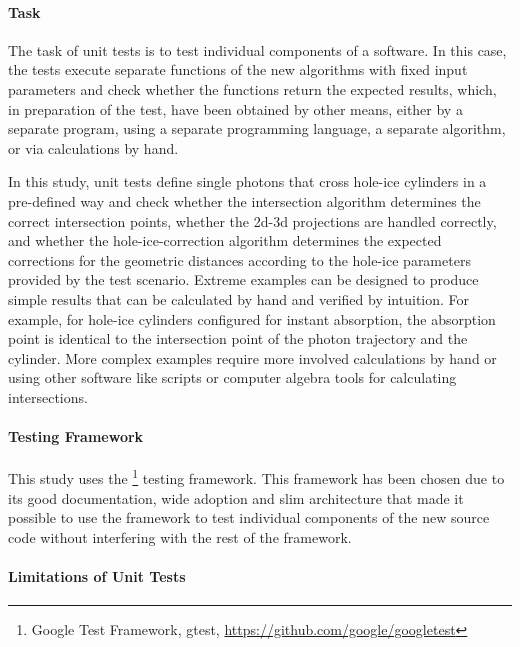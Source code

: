 \paragraph{Task}

The task of unit tests is to test individual components of a software.
In this case, the tests execute separate functions of the new algorithms
with fixed input parameters and check whether the functions return the
expected results, which, in preparation of the test, have been obtained
by other means, either by a separate program, using a separate
programming language, a separate algorithm, or via calculations by hand.

In this study, unit tests define single photons that cross hole-ice
cylinders in a pre-defined way and check whether the intersection
algorithm determines the correct intersection points, whether the 2d-3d
projections are handled correctly, and whether the hole-ice-correction
algorithm determines the expected corrections for the geometric
distances according to the hole-ice parameters provided by the test
scenario. Extreme examples can be designed to produce simple results
that can be calculated by hand and verified by intuition. For example,
for hole-ice cylinders configured for instant absorption, the absorption
point is identical to the intersection point of the photon trajectory
and the cylinder. More complex examples require more involved
calculations by hand or using other software like  scripts
or computer algebra tools for calculating intersections.

\paragraph{Testing Framework}

This study uses the
\footnote{Google Test Framework, gtest, \url{https://github.com/google/googletest}}
testing framework. This framework has been chosen due to its good
documentation, wide adoption and slim architecture that made it possible
to use the framework to test individual components of the new source
code without interfering with the rest of the \icesim framework.


\paragraph{Limitations of Unit Tests}

